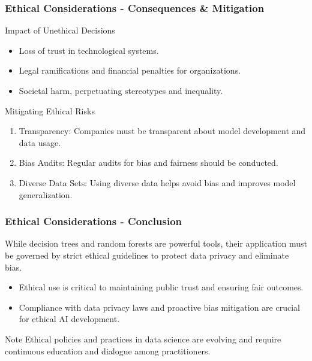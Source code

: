 \documentclass[aspectratio=169]{beamer}
\begin{document}
\begin{frame}[fragile]
    \frametitle{Ethical Considerations - Consequences & Mitigation}
    \begin{block}{Impact of Unethical Decisions}
        \begin{itemize}
            \item Loss of trust in technological systems.
            \item Legal ramifications and financial penalties for organizations.
            \item Societal harm, perpetuating stereotypes and inequality.
        \end{itemize}
    \end{block}
    
    \begin{block}{Mitigating Ethical Risks}
        \begin{enumerate}
            \item Transparency: Companies must be transparent about model development and data usage.
            \item Bias Audits: Regular audits for bias and fairness should be conducted.
            \item Diverse Data Sets: Using diverse data helps avoid bias and improves model generalization.
        \end{enumerate}
    \end{block}
\end{frame}

\begin{frame}[fragile]
    \frametitle{Ethical Considerations - Conclusion}
    While decision trees and random forests are powerful tools, their application must be governed by strict ethical guidelines to protect data privacy and eliminate bias. 
    \begin{itemize}
        \item Ethical use is critical to maintaining public trust and ensuring fair outcomes.
        \item Compliance with data privacy laws and proactive bias mitigation are crucial for ethical AI development.
    \end{itemize}
    \begin{block}{Note}
        Ethical policies and practices in data science are evolving and require continuous education and dialogue among practitioners.
    \end{block}
\end{frame}
\end{document}

